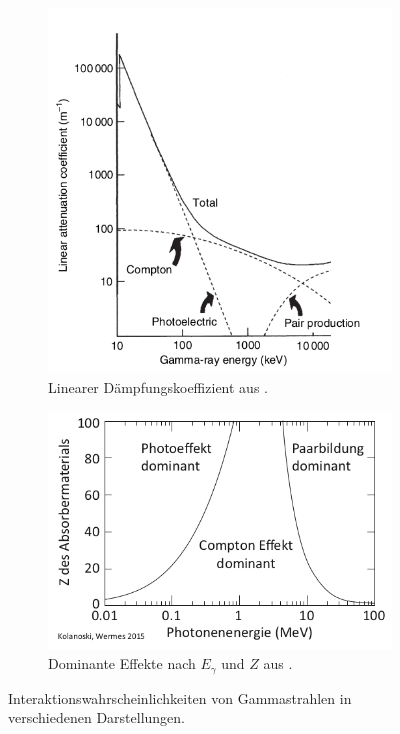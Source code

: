 \begin{figure}
	\centering
	\begin{subfigure}{.5\textwidth}
		\centering
		\includegraphics[width=0.9\linewidth]{./Bilder/E_mu_Gilmore.png}%
		\caption{Linearer Dämpfungskoeffizient aus \cite{book:gil}.}\label{fig:mu}
	\end{subfigure}%
	\begin{subfigure}{.5\textwidth}
		\centering
		\includegraphics[width=0.9\linewidth]{./Bilder/E_Z_Kolanoski.png}
		\caption{Dominante Effekte nach $E_\gamma$ und $Z$ aus \cite{book:kolano}.}\label{fig:z}
	\end{subfigure}
	\caption{Interaktionswahrscheinlichkeiten von Gammastrahlen in verschiedenen Darstellungen.}\label{fig:zmu}
\end{figure}

